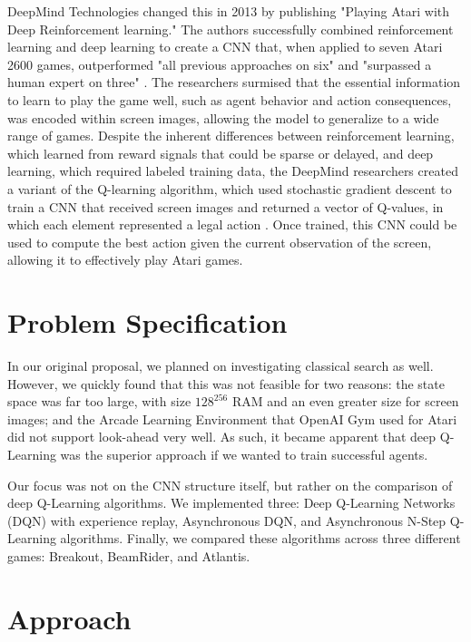 \documentclass[11pt]{article}
\begin{document}
DeepMind Technologies changed this in 2013 by publishing "Playing Atari with Deep Reinforcement learning." The authors successfully combined reinforcement learning and deep learning to create a CNN that, when applied to seven Atari 2600 games, outperformed "all previous approaches on six" and "surpassed a human expert on three" \cite{mnih}. The researchers surmised that the essential information to learn to play the game well, such as agent behavior and action consequences, was encoded within screen images, allowing the model to generalize to a wide range of games. Despite the inherent differences between reinforcement learning, which learned from reward signals that could be sparse or delayed, and deep learning, which required labeled training data, the DeepMind researchers created a variant of the Q-learning algorithm, which used stochastic gradient descent to train a CNN that received screen images and returned a vector of Q-values, in which each element represented a legal action \cite{mnih}. Once trained, this CNN could be used to compute the best action given the current observation of the screen, allowing it to effectively play Atari games.

\section{Problem Specification}

In our original proposal, we planned on investigating classical search as well. However, we quickly found that this was not feasible for two reasons: the state space was far too large, with size $128^{256}$ RAM and an even greater size for screen images; and the Arcade Learning Environment that OpenAI Gym used for Atari did not support look-ahead very well. As such, it became apparent that deep Q-Learning was the superior approach if we wanted to train successful agents.

Our focus was not on the CNN structure itself, but rather on the comparison of deep Q-Learning algorithms. We implemented three: Deep Q-Learning Networks (DQN) with experience replay, Asynchronous DQN, and Asynchronous N-Step Q-Learning algorithms. Finally, we compared these algorithms across three different games: Breakout, BeamRider, and Atlantis.

\section{Approach}
\end{document}
